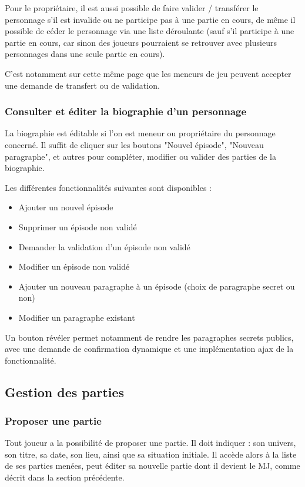 \documentclass[a4paper, 11pt, titlepage]{article}
\begin{document}
Pour le propriétaire, il est aussi possible de faire valider / transférer le personnage s'il est invalide ou ne participe pas à une partie en cours, de même il possible de céder le personnage via une liste déroulante (sauf s'il participe à une partie en cours, car sinon des joueurs pourraient se retrouver avec plusieurs personnages dans une seule partie en cours).

C'est notamment sur cette même page que les meneurs de jeu peuvent accepter une demande de transfert ou de validation.


\subsubsection {Consulter et éditer la biographie d'un personnage}

La biographie est éditable si l'on est meneur ou propriétaire du personnage concerné.
Il suffit de cliquer sur les boutons "Nouvel épisode", "Nouveau paragraphe", et autres pour compléter, modifier ou valider des parties de la biographie.

Les différentes fonctionnalités suivantes sont disponibles :
\begin{itemize}
\item
Ajouter un nouvel épisode
\item
Supprimer un épisode non validé
\item
Demander la validation d'un épisode non validé
\item
Modifier un épisode non validé
\item
Ajouter un nouveau paragraphe à un épisode (choix de paragraphe secret ou non)
\item
Modifier un paragraphe existant\\
\end{itemize}

Un bouton révéler permet notamment de rendre les paragraphes secrets publics, avec une demande de confirmation dynamique et une implémentation {\sc ajax} de la fonctionnalité.


\subsection {Gestion des parties}

\subsubsection {Proposer une partie}

Tout joueur a la possibilité de proposer une partie. Il doit indiquer : son univers, son titre, sa date, son lieu, ainsi que sa situation initiale. Il accède alors à la liste de ses parties menées, peut éditer sa nouvelle partie dont il devient le MJ, comme décrit dans la section précédente.
\end{document}
